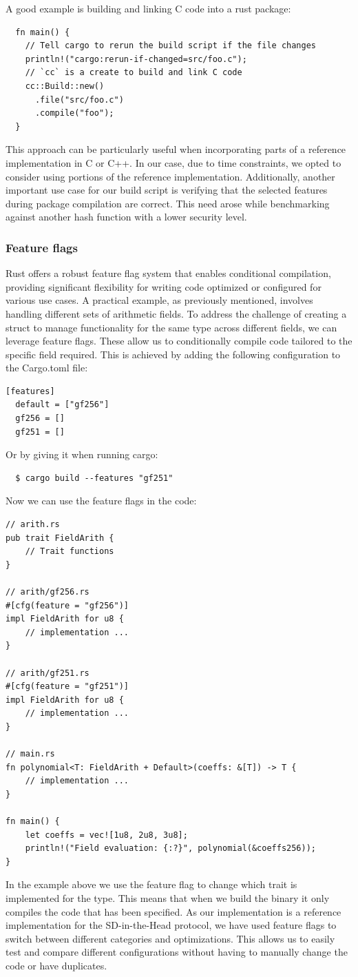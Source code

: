 \documentclass[twoside,11pt]{report}
\theoremstyle{definition}
\theoremstyle{plain}
\begin{document}
A good example is building and linking C code into a rust package:
\begin{verbatim}
  fn main() {
    // Tell cargo to rerun the build script if the file changes
    println!("cargo:rerun-if-changed=src/foo.c");
    // `cc` is a create to build and link C code
    cc::Build::new()
      .file("src/foo.c")
      .compile("foo");
  }
\end{verbatim}
This approach can be particularly useful when incorporating parts of a reference implementation in C or C++. In our case, due to time constraints, we opted to consider using portions of the reference implementation. Additionally, another important use case for our build script is verifying that the selected features during package compilation are correct. This need arose while benchmarking against another hash function with a lower security level.

\subsubsection{Feature flags}
Rust offers a robust feature flag system that enables conditional compilation, providing significant flexibility for writing code optimized or configured for various use cases.
A practical example, as previously mentioned, involves handling different sets of arithmetic fields. To address the challenge of creating a struct to manage functionality for the same type across different fields, we can leverage feature flags. These allow us to conditionally compile code tailored to the specific field required. This is achieved by adding the following configuration to the Cargo.toml file:
\begin{verbatim}
[features]
  default = ["gf256"]
  gf256 = []
  gf251 = []
\end{verbatim}
Or by giving it when running cargo:
\begin{verbatim}
  $ cargo build --features "gf251"
\end{verbatim}
Now we can use the feature flags in the code:
\begin{verbatim}
// arith.rs
pub trait FieldArith {
    // Trait functions
}

// arith/gf256.rs
#[cfg(feature = "gf256")]
impl FieldArith for u8 {
    // implementation ...
}

// arith/gf251.rs
#[cfg(feature = "gf251")]
impl FieldArith for u8 {
    // implementation ...
}

// main.rs
fn polynomial<T: FieldArith + Default>(coeffs: &[T]) -> T {
    // implementation ...
}

fn main() {
    let coeffs = vec![1u8, 2u8, 3u8];
    println!("Field evaluation: {:?}", polynomial(&coeffs256));
}
\end{verbatim}
In the example above we use the feature flag to change which trait is implemented for the  type. This means that when we build the binary it only compiles the code that has been specified.
As our implementation is a reference implementation for the SD-in-the-Head protocol, we have used feature flags to switch between different categories and optimizations. This allows us to easily test and compare different configurations without having to manually change the code or have duplicates.
\end{document}

